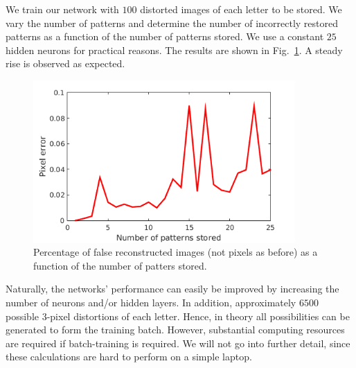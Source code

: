 \documentclass[pdftex,12pt,a4paper]{article}
\begin{document}
We train our network with $100$ distorted images of each letter to be stored. We vary the number of patterns and determine the number of incorrectly restored patterns as a function of the number of patterns stored. We use a constant $25$ hidden neurons for practical reasons. The results are shown in Fig.~\ref{fig:alternative_error}. A steady rise is observed as expected.
\begin{figure}
\centering
\includegraphics[width=10cm]{figs/alternative_error.png}
\caption{Percentage of false reconstructed images (not pixels as before) as a function of the number of patters stored.\label{fig:alternative_error}}
\end{figure}

Naturally, the networks' performance can easily be improved by increasing the number of neurons and/or hidden layers. In addition, approximately $6500$ possible 3-pixel distortions of each letter. Hence, in theory all possibilities can be generated to form the training batch. However, substantial computing resources are required if batch-training is required. We will not go into further detail, since these calculations are hard to perform on a simple laptop.


\newpage
\appendix

%
\end{document}
